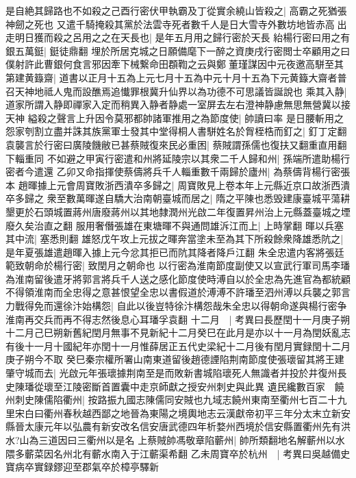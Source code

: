 是自絶其歸路也不如殺之己酉行密伏甲執霸及丁從實余繞山皆殺之|{
	高霸之死猶張神劒之死也}
又遣千騎掩殺其黨於法雲寺死者數千人是日大雪寺外數坊地皆赤高出走明日獲而殺之呂用之之在天長也|{
	是年五月用之歸行密於天長}
紿楊行密曰用之有銀五萬鋌|{
	鋌徒鼎翻}
埋於所居克城之日願備麾下一醉之資庚戌行密閲士卒顧用之曰僕射許此曹銀何食言邪因牽下械繋命田頵鞫之云與鄭董瑾謀因中元夜邀高駢至其第建黄籙齋|{
	道書以正月十五為上元七月十五為中元十月十五為下元黄籙大齋者普召天神地祗人鬼而設醮焉追懴罪根冀升仙界以為功德不可思議皆誕說也}
乘其入静|{
	道家所謂入静即禪家入定而稍異入静者静處一室屏去左右澄神静慮無思無營冀以接天神}
縊殺之聲言上升因令莫邪都帥諸軍推用之為節度使|{
	帥讀曰率}
是日腰斬用之怨家刳割立盡并誅其族黨軍士發其中堂得桐人書駢姓名於胷桎梏而釘之|{
	釘丁定翻}
袁襲言於行密曰廣陵饑敝已甚蔡賊復來民必重困|{
	蔡賊謂孫儒也復扶又翻重直用翻下輜重同}
不如避之甲寅行密遣和州將延陵宗以其衆二千人歸和州|{
	孫端所遣助楊行密者今遣還}
乙卯又命指揮使蔡儔將兵千人輜重數千兩歸於廬州|{
	為蔡儔背楊行密張本}
趙暉據上元會周寶敗浙西潰卒多歸之|{
	周寶敗見上卷本年上元縣近京口故浙西潰卒多歸之}
衆至數萬暉遂自驕大治南朝臺城而居之|{
	隋之平陳也悉毁建康臺城平蕩耕墾更於石頭城置蔣州唐廢蔣州以其地隸潤州光啟二年復置昇州治上元縣蓋臺城之堙廢久矣治直之翻}
服用奢僭張雄在東塘暉不與通問雄泝江而上|{
	上時掌翻}
暉以兵塞其中流|{
	塞悉則翻}
雄怒戊午攻上元拔之暉奔當塗未至為其下所殺餘衆降雄悉阬之|{
	是年夏張雄遣趙暉入據上元今忿其拒已而阬其降者降戶江翻}
朱全忠遣内客將張廷範致朝命於楊行密|{
	致閏月之朝命也}
以行密為淮南節度副使又以宣武行軍司馬李璠為淮南留後遣牙將郭言將兵千人送之感化節度使時溥自以於全忠為先進官為都統顧不得領淮南而全忠得之意甚恨望全忠以書假道於溥溥不許璠至泗州溥以兵襲之郭言力戰得免而還徐汴始構怨|{
	自此以後豈特徐汴構怨哉朱全忠以得朝命遂與楊行密争淮南再交兵而再不得志然後息心耳璠孚袁翻}
十二月　|{
	考異曰長歷閏十一月庚子朔十二月己巳朔新舊紀閏月無事不見新紀十二月癸巳在此月是亦以十一月為閏妖亂志有後十一月十國紀年亦閏十一月惟薛居正五代史梁紀十二月後有閏月實録閏十二月庚子朔今不取}
癸巳秦宗權所署山南東道留後趙德諲陷荆南節度使張瓌留其將王建肇守城而去|{
	光啟元年張瓌據荆南至是而敗新書城陷瓌死人無識者并投於井復州長史陳璠從瓌至江陵密斷首置囊中走京師獻之授安州刺史與此異}
遺民纔數百家　饒州刺史陳儒陷衢州|{
	按路振九國志陳儒同安賊也九域志饒州東南至衢州七百二十九里宋白曰衢州春秋越西鄙之地晉為東陽之境輿地志云漢獻帝初平三年分太末立新安縣晉太康元年以弘農有新安改名信安唐武德四年析婺州西境於信安縣置衢州先有洪水?山為三道因曰三衢州以是名}
上蔡賊帥馮敬章陷蘄州|{
	帥所類翻地名解蘄州以水隈多蘄菜因名州北有蘄水南入于江蘄渠希翻}
乙未周寶卒於杭州　|{
	考異曰吳越備史寶病卒實録鏐迎至郡氣卒於樟亭驛新}



